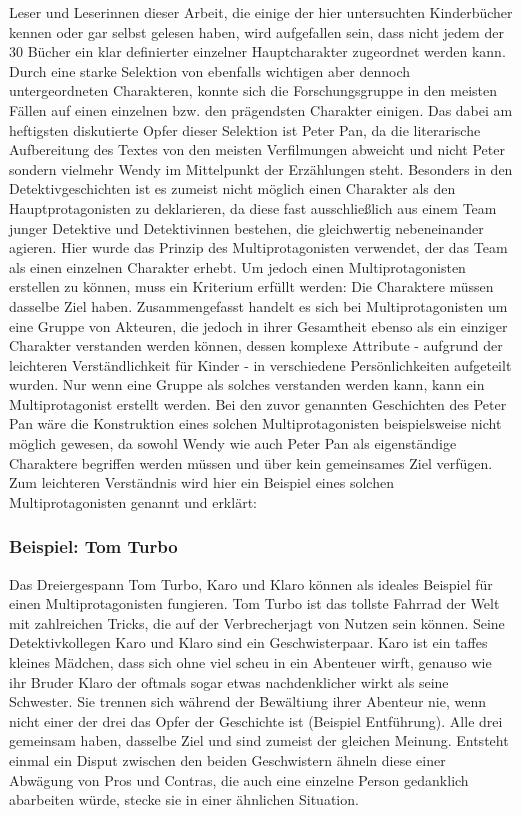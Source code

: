 Leser und Leserinnen dieser Arbeit, die einige der hier untersuchten
Kinderbücher kennen oder gar selbst gelesen haben, wird aufgefallen
sein, dass nicht jedem der 30 Bücher ein klar definierter einzelner
Hauptcharakter zugeordnet werden kann. Durch eine starke Selektion von
ebenfalls wichtigen aber dennoch untergeordneten Charakteren, konnte
sich die Forschungsgruppe in den meisten Fällen auf einen einzelnen bzw.
den prägendsten Charakter einigen. Das dabei am heftigsten diskutierte
Opfer dieser Selektion ist Peter Pan, da die literarische Aufbereitung
des Textes von den meisten Verfilmungen abweicht und nicht Peter sondern
vielmehr Wendy im Mittelpunkt der Erzählungen steht. Besonders in den
Detektivgeschichten ist es zumeist nicht möglich einen Charakter als den
Hauptprotagonisten zu deklarieren, da diese fast ausschließlich aus
einem Team junger Detektive und Detektivinnen bestehen, die gleichwertig
nebeneinander agieren. Hier wurde das Prinzip des Multiprotagonisten
verwendet, der das Team als einen einzelnen Charakter erhebt. Um jedoch
einen Multiprotagonisten erstellen zu können, muss ein Kriterium erfüllt
werden: Die Charaktere müssen dasselbe Ziel haben. Zusammengefasst
handelt es sich bei Multiprotagonisten um eine Gruppe von Akteuren, die
jedoch in ihrer Gesamtheit ebenso als ein einziger Charakter verstanden
werden können, dessen komplexe Attribute - aufgrund der leichteren
Verständlichkeit für Kinder - in verschiedene Persönlichkeiten
aufgeteilt wurden. Nur wenn eine Gruppe als solches verstanden werden
kann, kann ein Multiprotagonist erstellt werden. Bei den zuvor genannten
Geschichten des Peter Pan wäre die Konstruktion eines solchen
Multiprotagonisten beispielsweise nicht möglich gewesen, da sowohl Wendy
wie auch Peter Pan als eigenständige Charaktere begriffen werden müssen
und über kein gemeinsames Ziel verfügen. Zum leichteren Verständnis wird
hier ein Beispiel eines solchen Multiprotagonisten genannt und erklärt:

\subsubsection{Beispiel: Tom Turbo}

Das Dreiergespann Tom Turbo, Karo und Klaro können als ideales Beispiel
für einen Multiprotagonisten fungieren. Tom Turbo ist das tollste
Fahrrad der Welt mit zahlreichen Tricks, die auf der Verbrecherjagt von
Nutzen sein können. Seine Detektivkollegen Karo und Klaro sind ein
Geschwisterpaar. Karo ist ein taffes kleines Mädchen, dass sich ohne
viel scheu in ein Abenteuer wirft, genauso wie ihr Bruder Klaro der
oftmals sogar etwas nachdenklicher wirkt als seine Schwester. Sie
trennen sich während der Bewältiung ihrer Abenteur nie, wenn nicht einer
der drei das Opfer der Geschichte ist (Beispiel Entführung). Alle drei
gemeinsam haben, dasselbe Ziel und sind zumeist der gleichen Meinung.
Entsteht einmal ein Disput zwischen den beiden Geschwistern ähneln diese
einer Abwägung von Pros und Contras, die auch eine einzelne Person
gedanklich abarbeiten würde, stecke sie in einer ähnlichen Situation.
\parencite{brezina2000}

